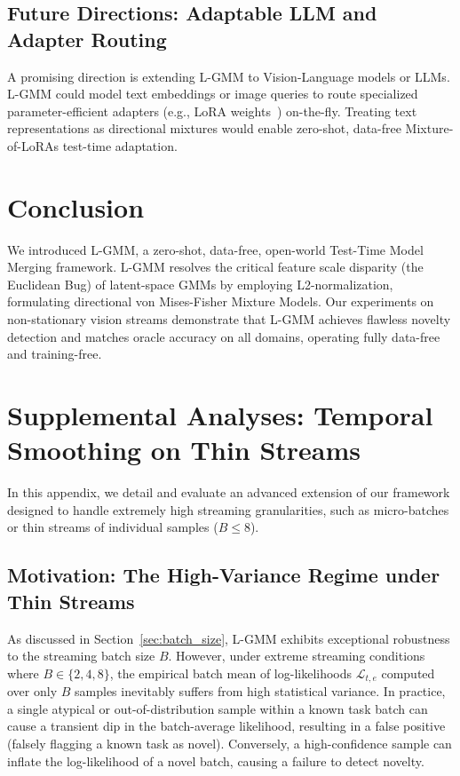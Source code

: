 \documentclass{article}
\theoremstyle{plain}
\theoremstyle{definition}
\theoremstyle{remark}
\begin{document}
\subsection{Future Directions: Adaptable LLM and Adapter Routing}
A promising direction is extending L-GMM to Vision-Language models or LLMs. L-GMM could model text embeddings or image queries to route specialized parameter-efficient adapters (e.g., LoRA weights~\cite{hu21}) on-the-fly. Treating text representations as directional mixtures would enable zero-shot, data-free Mixture-of-LoRAs test-time adaptation.

\section{Conclusion}
\label{sec:conclusion}

We introduced L-GMM, a zero-shot, data-free, open-world Test-Time Model Merging framework. L-GMM resolves the critical feature scale disparity (the Euclidean Bug) of latent-space GMMs by employing L2-normalization, formulating directional von Mises-Fisher Mixture Models. Our experiments on non-stationary vision streams demonstrate that L-GMM achieves flawless novelty detection and matches oracle accuracy on all domains, operating fully data-free and training-free.

\clearpage



\newpage
\appendix
\onecolumn
\section{Supplemental Analyses: Temporal Smoothing on Thin Streams}
\label{sec:appendix_ema}

In this appendix, we detail and evaluate an advanced extension of our framework designed to handle extremely high streaming granularities, such as micro-batches or thin streams of individual samples ($B \le 8$). 

\subsection{Motivation: The High-Variance Regime under Thin Streams}
As discussed in Section~\ref{sec:batch_size}, L-GMM exhibits exceptional robustness to the streaming batch size $B$. However, under extreme streaming conditions where $B \in \{2, 4, 8\}$, the empirical batch mean of log-likelihoods $\mathcal{L}_{t, e}$ computed over only $B$ samples inevitably suffers from high statistical variance. In practice, a single atypical or out-of-distribution sample within a known task batch can cause a transient dip in the batch-average likelihood, resulting in a false positive (falsely flagging a known task as novel). Conversely, a high-confidence sample can inflate the log-likelihood of a novel batch, causing a failure to detect novelty. 
\end{document}
